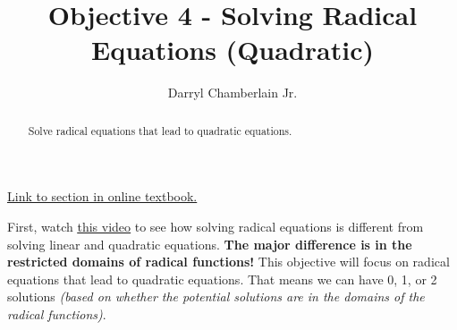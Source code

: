 \documentclass{ximera}
\author{Darryl Chamberlain Jr.}
\title{Objective 4 - Solving Radical Equations (Quadratic)}
\begin{document}
\begin{abstract}
Solve radical equations that lead to quadratic equations. 
\end{abstract}
\maketitle

\href{https://cnx.org/contents/mwjClAV_@8.1:uI1As6DV@15/Other-Types-of-Equations}{Link to section in online textbook.}

First, watch 
\underline{\href{https://mediasite.video.ufl.edu/Mediasite/Play/631ca9eb67f349698705032a7c42906d1d}{this video}} to see how solving radical equations is different from solving linear and quadratic equations. \textbf{The major difference is in the restricted domains of radical functions!} This objective will focus on radical equations that lead to quadratic equations. That means we can have 0, 1, or 2 solutions \textit{(based on whether the potential solutions are in the domains of the radical functions)}. 



\end{document}
